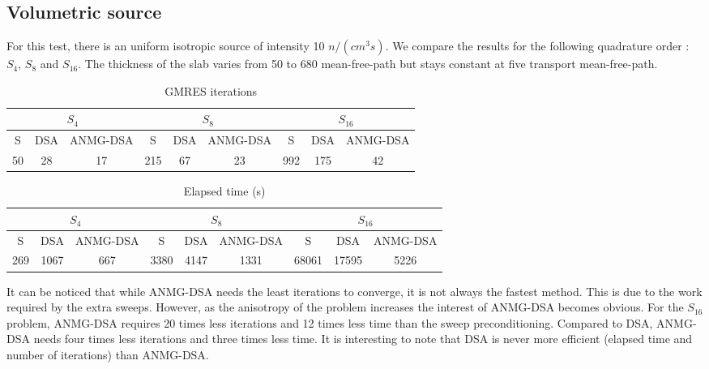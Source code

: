 \subsection{Volumetric source}
For this test, there is an uniform isotropic source of intensity 10 $n/(cm^3s)$. 
We compare the results for the following quadrature order : $S_4$, $S_8$ and 
$S_{16}$. The thickness of the slab varies from
50 to 680 mean-free-path but stays constant at five transport mean-free-path.
\begin{table}[H]
\begin{center}
\begin{tabular}{|c|c|c|c|c|c|c|c|c|}
\hline
\multicolumn{3}{|c|}{$S_4$} & \multicolumn{3}{c|}{$S_8$} & 
\multicolumn{3}{c|}{$S_{16}$} \\
\hline  
S & DSA & ANMG-DSA & S & DSA & ANMG-DSA & S & DSA & ANMG-DSA\\
\hline
50 & 28 & 17 & 215 & 67 & 23 & 992 & 175 & 42 \\
\hline
\end{tabular}
\caption{GMRES iterations}
\end{center}
\end{table}
\begin{table}[H]
\begin{center}
\begin{tabular}{|c|c|c|c|c|c|c|c|c|}
\hline
\multicolumn{3}{|c|}{$S_4$} & \multicolumn{3}{c|}{$S_8$} & 
\multicolumn{3}{c|}{$S_{16}$} \\
\hline  
S & DSA & ANMG-DSA & S & DSA & ANMG-DSA & S & DSA & ANMG-DSA\\
\hline
269 & 1067 & 667 & 3380 & 4147 & 1331 & 68061 & 17595 & 5226 \\
\hline
\end{tabular}
\caption{Elapsed time (s)}
\end{center}
\end{table}
It can be noticed that while ANMG-DSA needs the least iterations to converge, it is
not always the fastest method. This is due to the work required by the extra
sweeps. However, as the anisotropy of the problem increases the interest of
ANMG-DSA becomes obvious. For the $S_{16}$ problem, ANMG-DSA requires 20 times less 
iterations and 12 times less time than the sweep preconditioning. 
Compared to DSA, ANMG-DSA needs four times less iterations and three times less 
time. It is interesting to note that DSA is never more efficient (elapsed
time and number of iterations) than ANMG-DSA.

